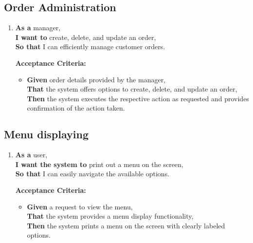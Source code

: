 
\subsection{Order Administration}

\begin{enumerate}[resume, label= \textbf{User Story \arabic*:}]
    \item \textbf{As a} manager,\\
    \textbf{I want to} create, delete, and update an order,\\
    \textbf{So that} I can efficiently manage customer orders.
    
    \textbf{Acceptance Criteria:}
    \begin{itemize}
        \item \textbf{Given} order details provided by the manager,\\
        \textbf{That} the system offers options to create, delete, and update an order,\\
        \textbf{Then} the system executes the respective action as requested and provides confirmation of the action taken.
    \end{itemize}
\end{enumerate}

\newpage
\subsection{Menu displaying}

\begin{enumerate}[resume, label= \textbf{User Story \arabic*:}]
    \item \textbf{As a} user,\\
    \textbf{I want the system to} print out a menu on the screen,\\
    \textbf{So that} I can easily navigate the available options.
    
    \textbf{Acceptance Criteria:}
    \begin{itemize}
        \item \textbf{Given} a request to view the menu,\\
        \textbf{That} the system provides a menu display functionality,\\
        \textbf{Then} the system prints a menu on the screen with clearly labeled options.
    \end{itemize}
\end{enumerate}

